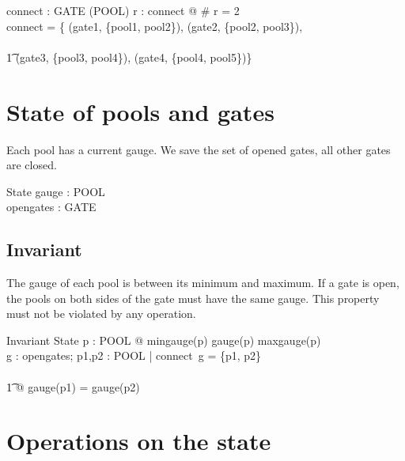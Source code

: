 \documentclass[a4paper]{article}
\begin{document}
\begin{axdef}
  connect : GATE \fun (\power POOL)
  \where
  \forall r : \ran connect @ \# r = 2\\
  connect = \{
  (gate1, \{pool1, pool2\}),
  (gate2, \{pool2, pool3\}),\\\\
  \t1 (gate3, \{pool3, pool4\}),
  (gate4, \{pool4, pool5\})\}
\end{axdef}

\section{State of pools and gates}
Each pool has a current gauge.
We save the set of opened gates, all other gates are closed. 

\begin{schema}{State}
  gauge : POOL \fun \nat\\
  opengates : \power GATE\\
\end{schema}

\subsection{Invariant}

The gauge of each pool is between its minimum and maximum.
If a gate is open, the pools on both sides of the gate must have the same gauge.
This property must not be violated by any operation.

\begin{schema}{Invariant}
  State
  \where
  \forall p : POOL @ mingauge(p) \leq gauge(p) \leq maxgauge(p)\\
  \forall g : opengates; p1,p2 : POOL | connect~g = \{p1, p2\} \\\\
  \t1 @ gauge(p1) = gauge(p2)\\
\end{schema}


\section{Operations on the state}
\end{document}

